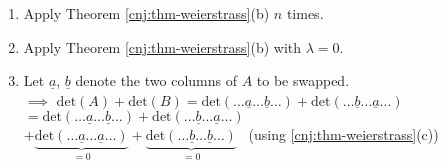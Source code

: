 \documentclass[
  12pt,
  a4paper,
  twoside]{article}
\theoremstyle{plain}
\theoremstyle{definition}
\begin{document}
\begin{enumerate}
\def\labelenumi{(\alph{enumi})}
\item
  Apply Theorem \ref{cnj:thm-weierstrass}(b) \(n\) times.
\item
  Apply Theorem \ref{cnj:thm-weierstrass}(b) with \(\lambda = 0\).
\item
  Let \(\underline{a}\), \(\underline{b}\) denote the two columns of \(A\) to be swapped.\\
  \(\implies\) \(\mathrm{det}(A) + \mathrm{det}(B) = \mathrm{det}(\ldots \underline{a} \ldots \underline{b} \ldots) + \mathrm{det}(\ldots \underline{b} \ldots \underline{a} \ldots)\)\\
  \hspace*{0.333em}\hspace*{0.333em}\hspace*{0.333em}\hspace*{0.333em}\hspace*{0.333em}\hspace*{0.333em}\hspace*{0.333em}\hspace*{0.333em}\hspace*{0.333em}\hspace*{0.333em}\hspace*{0.333em}\hspace*{0.333em}\(= \mathrm{det}(\ldots \underline{a} \ldots \underline{b} \ldots) + \mathrm{det}(\dots \underline{b} \ldots \underline{a} \ldots)\)\\
  \hspace*{0.333em}\hspace*{0.333em}\hspace*{0.333em}\hspace*{0.333em}\hspace*{0.333em}\hspace*{0.333em}\hspace*{0.333em}\hspace*{0.333em}\hspace*{0.333em}\hspace*{0.333em}\hspace*{0.333em}\hspace*{0.333em}\hspace*{0.333em}\hspace*{0.333em}\hspace*{0.333em}\hspace*{0.333em} \(+ \underbrace{\mathrm{det}(\ldots \underline{a} \ldots \underline{a} \ldots)}_{=0} + \underbrace{\mathrm{det}(\ldots \underline{b} \ldots \underline{b} \ldots)}_{=0}\) \hfill~{(using \ref{cnj:thm-weierstrass}(c))}\\

\end{enumerate}
\end{document}
